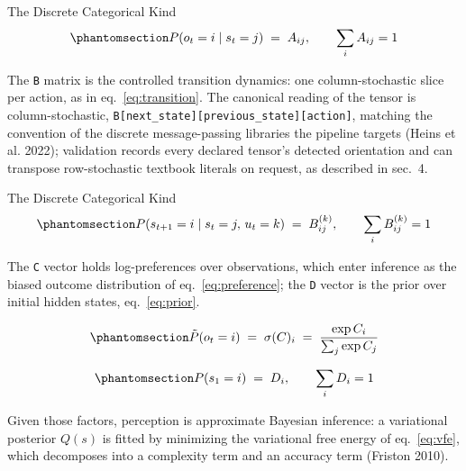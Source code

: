\documentclass[
  ignorenonframetext,
]{beamer}
\begin{document}
\begin{frame}{The Discrete Categorical Kind}
\begin{equation}\protect\phantomsection\label{eq:likelihood}{
P(o_t = i \mid s_t = j) \;=\; A_{ij}, \qquad \sum_i A_{ij} = 1
}\end{equation}

The \texttt{B} matrix is the controlled transition dynamics: one
column-stochastic slice per action, as in eq.~\ref{eq:transition}. The
canonical reading of the tensor is column-stochastic,
\texttt{B{[}next\_state{]}{[}previous\_state{]}{[}action{]}}, matching
the convention of the discrete message-passing libraries the pipeline
targets (Heins et al. 2022); validation records every declared tensor's
detected orientation and can transpose row-stochastic textbook literals
on request, as described in sec.~4.

\end{frame}

\begin{frame}{The Discrete Categorical Kind}
\begin{equation}\protect\phantomsection\label{eq:transition}{
P(s_{t+1} = i \mid s_t = j,\, u_t = k) \;=\; B^{(k)}_{ij}, \qquad \sum_i B^{(k)}_{ij} = 1
}\end{equation}

The \texttt{C} vector holds log-preferences over observations, which
enter inference as the biased outcome distribution of
eq.~\ref{eq:preference}; the \texttt{D} vector is the prior over initial
hidden states, eq.~\ref{eq:prior}.

\begin{equation}\protect\phantomsection\label{eq:preference}{
\tilde{P}(o_t = i) \;=\; \sigma(C)_i \;=\; \frac{\exp C_i}{\sum_j \exp C_j}
}\end{equation}

\begin{equation}\protect\phantomsection\label{eq:prior}{
P(s_1 = i) \;=\; D_i, \qquad \sum_i D_i = 1
}\end{equation}

Given those factors, perception is approximate Bayesian inference: a
variational posterior \(Q(s)\) is fitted by minimizing the variational
free energy of eq.~\ref{eq:vfe}, which decomposes into a complexity term
and an accuracy term (Friston 2010).

\end{frame}
\end{document}
